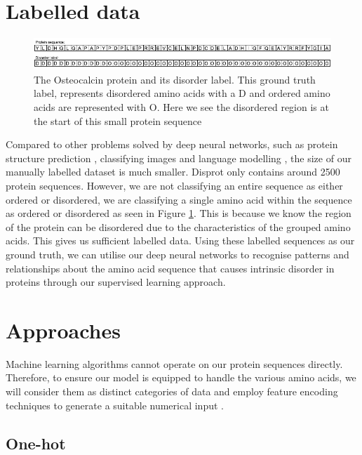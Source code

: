 \documentclass{l4proj}
\begin{document}
\section{Labelled data}

\begin{figure}
    \centering
    \includegraphics{images/groundtruth.pdf}    

    \caption{The Osteocalcin protein \citep{uniprot:22} and its disorder label. This ground truth label, represents disordered amino acids with a D and ordered amino acids are represented with O. Here we see the disordered region is at the start of this small protein sequence}

    \label{fig:groundtruth} 
\end{figure}

Compared to other problems solved by deep neural networks, such as protein structure prediction \citep{Jumper:21}, classifying images \citep{Xie:17} and language modelling \citep{Devlin:18}, the size of our manually labelled dataset is much smaller. Disprot only contains around 2500 protein sequences. However, we are not classifying an entire sequence as either ordered or disordered, we are classifying a single amino acid within the sequence as ordered or disordered as seen in Figure \ref{fig:groundtruth}. This is because we know the region of the protein can be disordered due to the characteristics of the grouped amino acids. This gives us sufficient labelled data. Using these labelled sequences as our ground truth, we can utilise our deep neural networks to recognise patterns and relationships about the amino acid sequence that causes intrinsic disorder in proteins through our supervised learning approach.

\section{Approaches}

Machine learning algorithms cannot operate on our protein sequences directly. Therefore, to ensure our model is equipped to handle the various amino acids, we will consider them as distinct categories of data and employ feature encoding techniques to generate a suitable numerical input \citep{Kumar:20}.

\subsection{One-hot}
\end{document}
